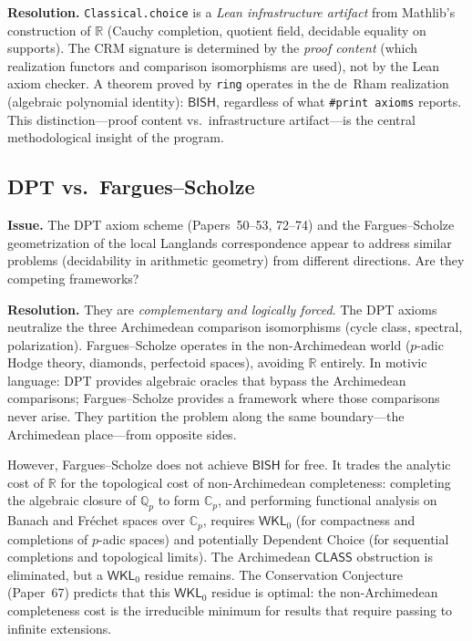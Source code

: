 \documentclass[11pt,a4paper]{article}
\theoremstyle{plain}
\theoremstyle{definition}
\newcommand{\BISH}{\textsf{BISH}}
\newcommand{\WKL}{\textsf{WKL}_0}
\newcommand{\CLASS}{\textsf{CLASS}}
\newcommand{\Q}{\mathbb{Q}}
\newcommand{\R}{\mathbb{R}}
\newcommand{\C}{\mathbb{C}}
\begin{document}
\textbf{Resolution.} \texttt{Classical.choice} is a \emph{Lean infrastructure artifact} from Mathlib's construction of $\R$ (Cauchy completion, quotient field, decidable equality on supports). The CRM signature is determined by the \emph{proof content} (which realization functors and comparison isomorphisms are used), not by the Lean axiom checker. A theorem proved by \texttt{ring} operates in the de~Rham realization (algebraic polynomial identity): $\BISH$, regardless of what \texttt{\#print axioms} reports. This distinction---proof content vs.\ infrastructure artifact---is the central methodological insight of the program.

\subsection{DPT vs.\ Fargues--Scholze}\label{sec:dpt-fs}

\textbf{Issue.} The DPT axiom scheme (Papers~50--53, 72--74) and the Fargues--Scholze geometrization of the local Langlands correspondence appear to address similar problems (decidability in arithmetic geometry) from different directions. Are they competing frameworks?

\textbf{Resolution.} They are \emph{complementary and logically forced}. The DPT axioms neutralize the three Archimedean comparison isomorphisms (cycle class, spectral, polarization). Fargues--Scholze operates in the non-Archimedean world ($p$-adic Hodge theory, diamonds, perfectoid spaces), avoiding $\R$ entirely. In motivic language: DPT provides algebraic oracles that bypass the Archimedean comparisons; Fargues--Scholze provides a framework where those comparisons never arise. They partition the problem along the same boundary---the Archimedean place---from opposite sides.

However, Fargues--Scholze does not achieve $\BISH$ for free. It trades the analytic cost of $\R$ for the topological cost of non-Archimedean completeness: completing the algebraic closure of $\Q_p$ to form $\C_p$, and performing functional analysis on Banach and Fr\'echet spaces over $\C_p$, requires $\WKL$ (for compactness and completions of $p$-adic spaces) and potentially Dependent Choice (for sequential completions and topological limits). The Archimedean $\CLASS$ obstruction is eliminated, but a $\WKL$ residue remains. The Conservation Conjecture (Paper~67) predicts that this $\WKL$ residue is optimal: the non-Archimedean completeness cost is the irreducible minimum for results that require passing to infinite extensions.
\end{document}
